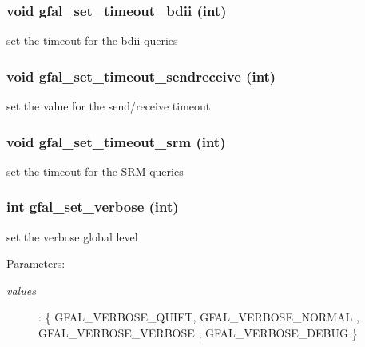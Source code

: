\subsubsection{\setlength{\rightskip}{0pt plus 5cm}void gfal\_\-set\_\-timeout\_\-bdii (int)}\label{group__common__group_g7fc461515a2cdf649fd516319cb54ea9}


set the timeout for the bdii queries 
\subsubsection{\setlength{\rightskip}{0pt plus 5cm}void gfal\_\-set\_\-timeout\_\-sendreceive (int)}\label{group__common__group_gedd91bb343f17bc2c0ba9db1203f1819}


set the value for the send/receive timeout 
\subsubsection{\setlength{\rightskip}{0pt plus 5cm}void gfal\_\-set\_\-timeout\_\-srm (int)}\label{group__common__group_gc0dac1437f150d4b5b8779f456050bec}


set the timeout for the SRM queries 
\subsubsection{\setlength{\rightskip}{0pt plus 5cm}int gfal\_\-set\_\-verbose (int)}\label{group__common__group_g331e181c2fadd801321ad43033835052}


set the verbose global level 

\begin{Desc}
\item[Parameters:]
\begin{description}
\item[{\em values}]: \{ GFAL\_\-VERBOSE\_\-QUIET, GFAL\_\-VERBOSE\_\-NORMAL , GFAL\_\-VERBOSE\_\-VERBOSE , GFAL\_\-VERBOSE\_\-DEBUG \} \end{description}
\end{Desc}
